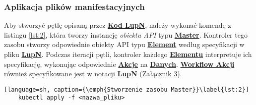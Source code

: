\subsubsection{Aplikacja plików manifestacyjnych}

Aby stworzyć pętlę opisaną przez \hyperlink{def:kod-lupn}{\textbf{Kod LupN}}, należy wykonać komendę z listingu \ref{lst:2}, która tworzy instancję \textit{obiektu API} typu \hyperlink{def:master}{\textbf{Master}}. Kontroler tego zasobu stworzy odpowiednie obiekty API typu \hyperlink{def:element}{\textbf{Element}} według specyfikacji w pliku \hyperlink{def:plik-lupn}{\textbf{LupN}}. Podczas iteracji pętli, kontroler każdego \hyperlink{def:element}{\textbf{Elementu}} interpretuje ich specyfikację, wykonując odpowiednie \hyperlink{def:akcja}{\textbf{Akcje}} na \hyperlink{def:dane}{\textbf{Danych}}. \hyperlink{def:workflow-petli}{\textbf{Workflow Akcji}} również specyfikowane jest w notacji \hyperlink{def:lupn}{\textbf{LupN}} (\hyperref[appendix:3]{Załącznik 3}).

\begin{lstlisting}[language=sh, caption={\emph{Stworzenie zasobu Master}}\label{lst:2}]
    kubectl apply -f <nazwa_pliku>
\end{lstlisting}

